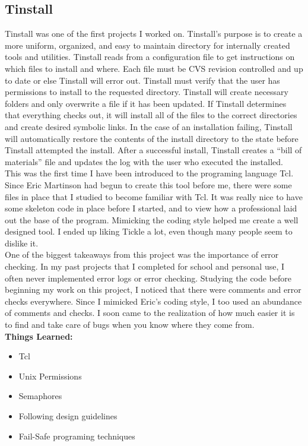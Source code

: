 \documentclass[letterpaper,10pt,notitlepage,fleqn]{article}
\begin{document}
\subsection{Tinstall}
\indent Tinstall was one of the first projects I worked on. Tinstall's purpose is to create 
a more uniform, organized, and easy to maintain directory for internally created 
tools and utilities. Tinstall reads from a configuration file to get instructions 
on which files to install and where. Each file must be CVS revision controlled and 
up to date or else Tinstall will error out. Tinstall must verify that the user has 
permissions to install to the requested directory. Tinstall will create necessary folders and only overwrite 
a file if it has been updated. If Tinstall determines that everything checks 
out, it will install all of the files to the correct directories and create desired 
symbolic links. In the case of an installation failing, Tinstall will automatically restore the 
contents of the install directory to the state before Tinstall attempted the install. After a successful 
install, Tinstall creates a ``bill of materials'' file and updates the log with the 
user who executed the installed.
\\
\indent This was the first time I have been introduced to the programing language Tcl. 
Since Eric Martinson had begun to create this tool before me, there were 
some files in place that I studied to become familiar with Tcl. It was really 
nice to have some skeleton code in place before I started, and to view how a professional
laid out the base of the program. Mimicking the coding style helped me create a well designed 
tool. I ended up liking Tickle a lot, even though many people seem to dislike it. 
\\
\indent One of the biggest takeaways from this project was the importance of error checking.
In my past projects that I completed for school and personal use, I often 
never implemented error logs or error checking. Studying the code before beginning 
my work on this project, I noticed that there were comments and error checks everywhere.
Since I mimicked Eric's coding style, I too used an abundance of comments and checks.
I soon came to the realization of how much easier it is to find and 
take care of bugs when you know where they come from. \\


\textbf{Things Learned:}
\begin{itemize} 
        \item Tcl
        \item Unix Permissions
        \item Semaphores
        \item Following design guidelines
        \item Fail-Safe programing techniques
    \end{itemize}
\end{document}
